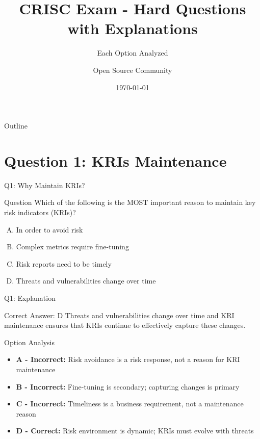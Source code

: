 \documentclass{beamer}
\title{CRISC Exam - Hard Questions with Explanations}
\subtitle{Each Option Analyzed}
\author{Open Source Community }
\date{\today}
\begin{document}
	
	\begin{frame}
		\titlepage
	\end{frame}
	
	\begin{frame}{Outline}
		\tableofcontents
	\end{frame}
	
	\section{Question 1: KRIs Maintenance}
	
	\begin{frame}{Q1: Why Maintain KRIs?}
		\begin{block}{Question}
			Which of the following is the MOST important reason to maintain key risk indicators (KRIs)?
		\end{block}
		\begin{enumerate}[(A)]
			\item In order to avoid risk
			\item Complex metrics require fine-tuning
			\item Risk reports need to be timely
			\item Threats and vulnerabilities change over time
		\end{enumerate}
	\end{frame}
	
	\begin{frame}{Q1: Explanation}
		\begin{block}{Correct Answer: D}
			Threats and vulnerabilities change over time and KRI maintenance ensures that KRIs continue to effectively capture these changes.
		\end{block}
		\begin{block}{Option Analysis}
			\begin{itemize}
				\item \textbf{A - Incorrect:} Risk avoidance is a risk response, not a reason for KRI maintenance
				\item \textbf{B - Incorrect:} Fine-tuning is secondary; capturing changes is primary
				\item \textbf{C - Incorrect:} Timeliness is a business requirement, not a maintenance reason
				\item \textbf{D - Correct:} Risk environment is dynamic; KRIs must evolve with threats
			\end{itemize}
		\end{block}
	\end{frame}
	
\end{document}

